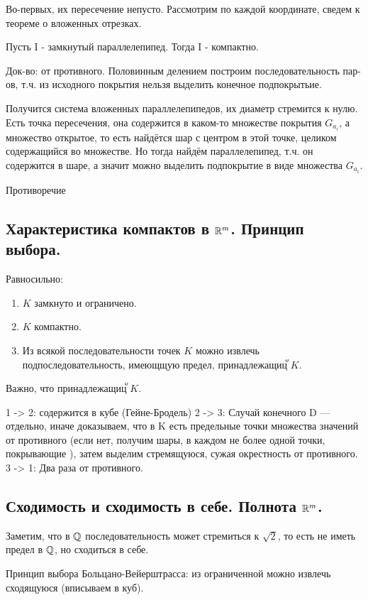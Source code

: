 \documentclass[12pt, a4paper]{article}
\begin{document}
Во-первых, их пересечение непусто. 
Рассмотрим по каждой координате, 
сведем к теореме о вложенных отрезках. 

Пусть I - замкнутый параллелепипед. Тогда I - компактно.

Док-во: от противного.
Половинным делением построим последовательность пар-ов, т.ч.
из исходного покрытия нельзя выделить конечное подпокрытьие.

Получится система вложенных параллелепипедов, их диаметр стремится к нулю.
Есть точка пересечения, она содержится в каком-то множестве покрытия $G_{a_i}$, 
а множество открытое, то есть найдётся шар с центром в этой точке, целиком содержащийся во множестве.
Но тогда найдём параллелепипед, т.ч. он содержится в шаре, 
а значит можно выделить подпокрытие в виде множества $G_{a_i}$.

Противоречие

\subsection{Характеристика компактов в ${\mathbb{R}}^m$. Принцип выбора.}

Равносильно: 

\begin{enumerate}
    \item $K$ замкнуто и ограничено.
    \item $K$ компактно.
    \item Из всякой последовательности точек $K$ можно извлечь подпоследовательность, имеющщую предел, принадлежащицั $K$.
\end{enumerate}

Важно, что принадлежащицั $K$.

1 -> 2: содержится в кубе (Гейне-Бродель)
2 -> 3: Случай конечного D — отдельно, иначе доказываем, что в K есть предельные точки множества значений от противного (если нет, получим шары, в каждом не более одной точки, покрывающие ), затем выделим стремящуюся, сужая окрестность от противного. 
3 -> 1: Два раза от противного.

\subsection{Сходимость и сходимость в себе. Полнота ${\mathbb{R}}^m$.}

Заметим, что в ${\mathbb{Q}}$ последовательность может стремиться к $\sqrt{2}$, 
то есть не иметь предел в ${\mathbb{Q}}$, но сходиться в себе.

Принцип выбора Больцано-Вейерштрасса: из ограниченной можно извлечь сходящуюся (вписываем в куб).
\end{document}
